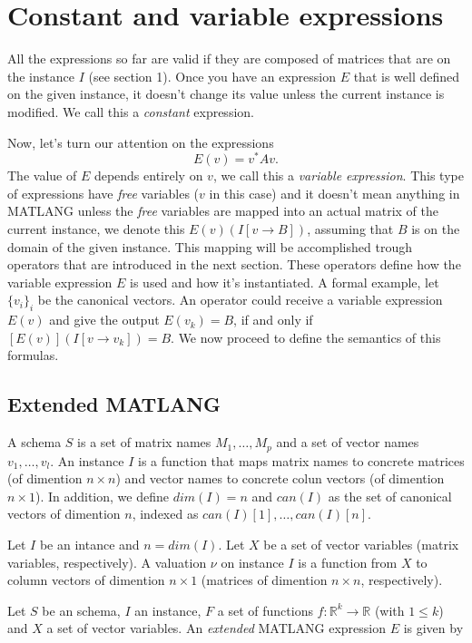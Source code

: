 \section{Constant and variable expressions}

All the expressions so far are valid if they are composed of matrices that are on the instance $I$ (see section 1). Once you have an expression $E$ that is well defined on the given instance, it doesn't change its value unless the current instance is modified. We call this a \textit{constant} expression.

Now, let's turn our attention on the expressions $$E(v)=v^* Av.$$ The value of $E$ depends entirely on $v$, we call this a \textit{variable expression}. This type of expressions have \textit{free} variables ($v$ in this case) and it doesn't mean anything in MATLANG unless the \textit{free} variables are mapped into an actual matrix of the current instance, we denote this $E(v)(I[v\rightarrow B])$, assuming that $B$ is on the domain of the given instance. This mapping will be accomplished trough operators that are introduced in the next section. These operators define how the variable expression $E$ is used and how it's instantiated.
A formal example, let $\lbrace v_i\rbrace_i$ be the canonical vectors. An operator could receive a variable expression $E(v)$ and give the output $E(v_k)=B$, if and only if $[E(v)](I[v\rightarrow v_k])=B$.
We now proceed to define the semantics of this formulas.

\subsection{Extended MATLANG}

A schema $S$ is a set of matrix names $M_1,\ldots, M_p$ and a set of vector names $v_1,\ldots, v_l$.
An instance $I$ is a function that maps matrix names to concrete matrices (of dimention $n\times n$) and vector names to concrete colun vectors (of dimention $n\times 1$). 
In addition, we define $dim(I)=n$ and $can(I)$ as the set of canonical vectors of dimention $n$, indexed as $can(I)[1], \ldots,can(I)[n]$.

Let $I$ be an intance and $n=dim(I)$. Let $X$ be a set of vector variables (matrix variables, respectively). A valuation $\nu$ on instance $I$ is a function from $X$ to column vectors of dimention $n\times 1$ (matrices of dimention $n\times n$, respectively). 

Let $S$ be an schema, $I$ an instance, $F$ a set of functions $f:\mathbb{R}^{k}\rightarrow\mathbb{R}$ (with $1\leq k$) and $X$ a set of vector variables. An \textit{extended} MATLANG expression $E$ is given by

